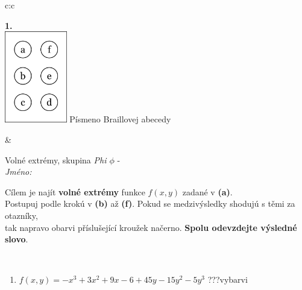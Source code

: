 \documentclass[10pt]{report}
\begin{document}
\begin{tabular}{c:c}
\begin{minipage}[c][104.5mm][t]{0.5\linewidth}
\begin{center}
\begin{minipage}{0.79\linewidth}
\begin{center}
\begin{varwidth}{\linewidth}
\begin{enumerate}
\end{enumerate}
\end{varwidth}
\end{center}
\end{minipage}
\begin{minipage}{0.20\linewidth}
\begin{center}
{\Huge\bfseries 1.} \\[2mm]
\includegraphics[height=40mm]{../images/braille.png}
{\small Písmeno Braillovej abecedy}
\end{center}
\end{minipage}
\end{center}
\end{minipage}
&
\begin{minipage}[c][104.5mm][t]{0.5\linewidth}
\begin{center}
\vspace{7mm}
{\huge Volné extrémy, skupina \textit{Phi $\phi$} -}\\[5mm]
\textit{Jméno:}\phantom{xxxxxxxxxxxxxxxxxxxxxxxxxxxxxxxxxxxxxxxxxxxxxxxxxxxxxxxxxxxxxxxxx}\\[5mm]
\begin{minipage}{0.95\linewidth}
\begin{center}
Cílem je najít \textbf{volné extrémy} funkce $f(x,y)$ zadané v \textbf{(a)}.\\Postupuj podle krokú v \textbf{(b)} až \textbf{(f)}. Pokud se medzivýsledky shodujú s těmi za otazníky,\\tak napravo obarvi příslušející kroužek načerno. \textbf{Spolu odevzdejte výsledné slovo}.
\end{center}
\end{minipage}
\\[1mm]
\begin{minipage}{0.79\linewidth}
\begin{center}
\begin{varwidth}{\linewidth}
\begin{enumerate}
\normalsize
\item $f(x,y)=-x^3+3x^2+9x-6+45y-15y^2-5y^3$\quad \dotfill\; ???\;\dotfill \quad vybarvi

\end{enumerate}
\end{varwidth}
\end{center}
\end{minipage}
\end{center}
\end{minipage}
\end{tabular}
\end{document}
